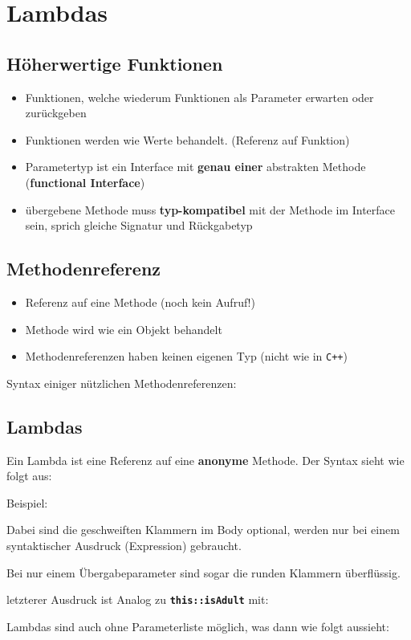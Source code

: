 \section*{Lambdas}
	\subsection*{Höherwertige Funktionen}
		\begin{itemize}[noitemsep]
			\item Funktionen, welche wiederum Funktionen als Parameter erwarten oder zurückgeben
			\item Funktionen werden wie Werte behandelt. (Referenz auf Funktion)
			\item Parametertyp ist ein Interface mit \textbf{genau einer} abstrakten Methode (\textbf{functional Interface})
			\item übergebene Methode muss \textbf{typ-kompatibel} mit der Methode im Interface sein, sprich gleiche Signatur und Rückgabetyp
		\end{itemize}
	
	\subsection*{Methodenreferenz}
		\begin{minipage}{6.3cm}
			\begin{itemize}[noitemsep]
				\item Referenz auf eine Methode (noch kein Aufruf!)
				\item Methode wird wie ein Objekt behandelt
				\item Methodenreferenzen haben keinen eigenen Typ (nicht wie in \texttt{C++})
			\end{itemize}
		\end{minipage}
		\hspace*{0.5cm}
		\begin{minipage}{12cm}
			
		\end{minipage}
		Syntax einiger nützlichen Methodenreferenzen:
		
	\subsection*{Lambdas}
		Ein Lambda ist eine Referenz auf eine \textbf{anonyme} Methode. Der Syntax sieht wie folgt aus:
		
		Beispiel:
		
		Dabei sind die geschweiften Klammern im Body optional, werden nur bei einem syntaktischer Ausdruck (Expression) gebraucht.
		
		Bei nur einem Übergabeparameter sind sogar die runden Klammern überflüssig.
		
		letzterer Ausdruck ist Analog zu \texttt{\textbf{this::isAdult}} mit:
		
		Lambdas sind auch ohne Parameterliste möglich, was dann wie folgt aussieht:
		